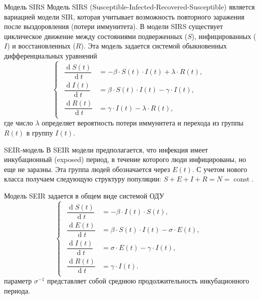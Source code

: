 \documentclass[notheorems]{beamer}
\renewcommand{\d}{\operatorname{d}}
\begin{document}

\begin{frame}{Модель SIRS}
	 Модель SIRS (Susceptible-Infected-Recovered-Susceptible) является вариацией модели SIR, которая учитывает возможность повторного заражения после выздоровления (потери иммунитета). В модели SIRS существует циклическое движение между состояниями подверженных ($S$), инфицированных ($I$) и восстановленных ($R$). Эта модель задается системой обыкновенных дифференциальных уравнений
	\begin{equation}
		\left\{ 
		\begin{gathered} 
			\begin{aligned}
				\dfrac {\d S(t)}{\d t} &= -\beta \cdot S(t) \cdot I(t) + \lambda \cdot R(t),\\
				\dfrac{\d I(t)}{\d t} &= \beta \cdot S(t)\cdot I(t) - \gamma\cdot I(t),\\
				\dfrac{\d R(t)}{\d t} &= \gamma\cdot I(t) - \lambda \cdot R(t),
			\end{aligned}
		\end{gathered} 
		\right.
	\end{equation}
	где число $\lambda$ определяет вероятность потери иммунитета и перехода из группы $R(t)$ в группу $I(t)$.
\end{frame}


\begin{frame}
	{SEIR-модель}
	В SEIR модели предполагается, что инфекция имеет инкубационный (exposed) период, в течение которого люди инфицированы, но
	еще не заразны. Эта группа людей обозначается через $E(t)$. С учетом нового класса получаем следующую структуру
	популяции:
	$S + E + I + R = N = \operatorname{const}.$
	
	Модель SEIR задается в общем виде системой ОДУ
	\begin{equation}
		\left\{ 
		\begin{gathered} 
			\begin{aligned}
				\dfrac {\d S(t)}{\d t} &= - \beta \cdot I(t)\cdot S(t),\\
				\dfrac {\d E(t)}{\d t} &= \beta \cdot S(t)\cdot I(t) - \sigma\cdot E(t),\\
				\dfrac{\d I(t)}{\d t} &=\sigma \cdot E(t) - \gamma\cdot I(t),\\
				\dfrac{\d R(t)}{\d t} &= \gamma\cdot I(t). 
			\end{aligned}
		\end{gathered} 
		\right.
	\end{equation}
	параметр $\sigma^{-1}$ представляет собой среднюю продолжительность инкубационного периода.
\end{frame}
\end{document}
